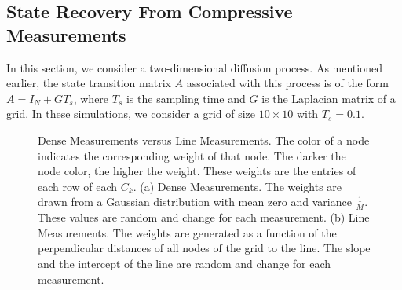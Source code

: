 \documentclass[11pt,draftcls,onecolumn]{IEEEtran}
\begin{document}
\subsection{State Recovery From Compressive Measurements}
\label{sec:exprecovery}

In this section, we consider a two-dimensional diffusion process. As mentioned earlier, the state transition matrix $A$ associated with this process is of the form $A = I_N + GT_s$, where $T_s$ is the sampling time and $G$ is the Laplacian matrix of a grid. In these simulations, we consider a grid of size $10 \times 10$ with $T_s = 0.1$.

\begin{figure}[tb]
\centering
{}
\caption{
Dense Measurements versus Line Measurements.
The color of a node indicates the corresponding weight of that node. The darker the node color, the higher the weight. These weights are the entries of each row of each $C_k$. (a) Dense Measurements. The weights are drawn from a Gaussian distribution with mean zero and variance $\frac{1}{M}$. These values are random and change for each measurement.
(b) Line Measurements. The weights are generated as a function of the perpendicular distances of all nodes of the grid to the line. The slope and the intercept of the line are random and change for each measurement.}
\label{fig:Dense_Line_Meas}
\end{figure}
\end{document}
